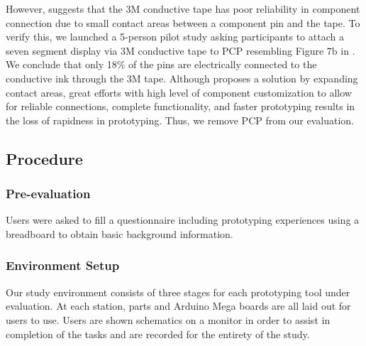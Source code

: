 However, \cite{Circuit_Stickers} suggests that the 3M conductive tape has poor reliability in component connection due to small contact areas between a component pin and the tape. To verify this, we launched a 5-person pilot study asking participants to attach a seven segment display via 3M conductive tape to PCP resembling Figure 7b in \cite{Instant_Inkjet_Circuits}. We conclude that only 18\% of the pins are electrically connected to the conductive ink through the 3M tape. Although \cite{Circuit_Stickers} proposes a solution by expanding contact areas, great efforts with high level of component customization to allow for reliable connections, complete functionality, and faster prototyping results in the loss of rapidness in prototyping. Thus, we remove PCP from our evaluation.



\subsection{Procedure}

\subsubsection{Pre-evaluation}

Users were asked to fill a questionnaire including prototyping experiences using a breadboard to obtain basic background information.

\subsubsection{Environment Setup}
Our study environment consists of three stages for each prototyping tool under evaluation. At each station, parts and Arduino Mega boards are all laid out for users to use. Users are shown schematics on a monitor in order to assist in completion of the tasks and are recorded for the entirety of the study.

